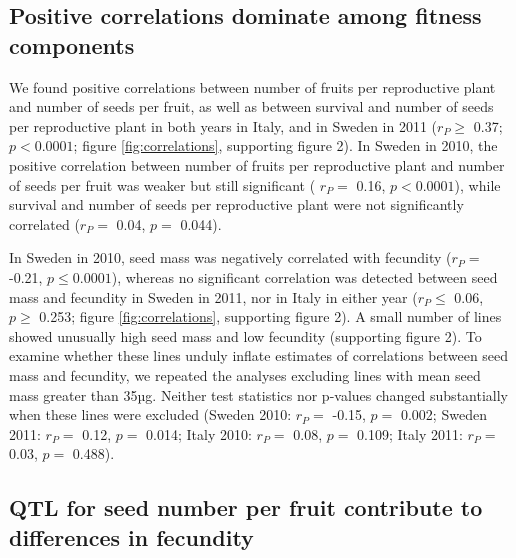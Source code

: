 \documentclass[]{article}
\begin{document}
\hypertarget{positive-correlations-dominate-among-fitness-components}{%
\subsection{Positive correlations dominate among fitness components}\label{positive-correlations-dominate-among-fitness-components}}

We found positive correlations between number of fruits per reproductive plant and number of seeds per fruit, as well as between survival and number of seeds per reproductive plant in both years in Italy, and in Sweden in 2011 (\(r_P \geq\)
0.37;
\(p < 0.0001\);
figure \ref{fig:correlations}, supporting figure 2).
In Sweden in 2010, the positive correlation between number of fruits per reproductive plant and number of seeds per fruit was weaker but still significant (
\(r_P=\) 0.16,
\(p<0.0001\)),
while survival and number of seeds per reproductive plant were not significantly correlated
(\(r_P=\) 0.04,
\(p=\) 0.044).

In Sweden in 2010, seed mass was negatively correlated with fecundity
(\(r_P=\) -0.21,
\(p \leq 0.0001\)),
whereas no significant correlation was detected between seed mass and fecundity in Sweden in 2011, nor in Italy in either year
(\(r_P \leq\) 0.06,
\(p \geq\) 0.253;
figure \ref{fig:correlations}, supporting figure 2).
A small number of lines showed unusually high seed mass and low fecundity (supporting figure 2).
To examine whether these lines unduly inflate estimates of correlations between seed mass and fecundity, we repeated the analyses excluding lines with mean seed mass greater than 35µg.
Neither test statistics nor p-values changed substantially when these lines were excluded
(Sweden 2010: \(r_P=\) -0.15, \(p=\) 0.002;
Sweden 2011: \(r_P=\) 0.12, \(p=\) 0.014;
Italy 2010: \(r_P=\) 0.08, \(p=\) 0.109;
Italy 2011: \(r_P=\) 0.03, \(p=\) 0.488).

\hypertarget{qtl-for-seed-number-per-fruit-contribute-to-differences-in-fecundity}{%
\subsection{QTL for seed number per fruit contribute to differences in fecundity}\label{qtl-for-seed-number-per-fruit-contribute-to-differences-in-fecundity}}
\end{document}
